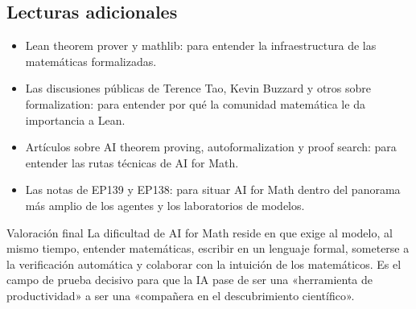 \documentclass[a4paper]{article}
\begin{document}
\subsection{Lecturas adicionales}

\begin{itemize}
\item Lean theorem prover y mathlib: para entender la infraestructura de las matemáticas formalizadas.
\item Las discusiones públicas de Terence Tao, Kevin Buzzard y otros sobre formalization: para entender por qué la comunidad matemática le da importancia a Lean.
\item Artículos sobre AI theorem proving, autoformalization y proof search: para entender las rutas técnicas de AI for Math.
\item Las notas de EP139 y EP138: para situar AI for Math dentro del panorama más amplio de los agentes y los laboratorios de modelos.
\end{itemize}

\begin{importantbox}{Valoración final}
La dificultad de AI for Math reside en que exige al modelo, al mismo tiempo, entender matemáticas, escribir en un lenguaje formal, someterse a la verificación automática y colaborar con la intuición de los matemáticos. Es el campo de prueba decisivo para que la IA pase de ser una «herramienta de productividad» a ser una «compañera en el descubrimiento científico».
\end{importantbox}
\end{document}
